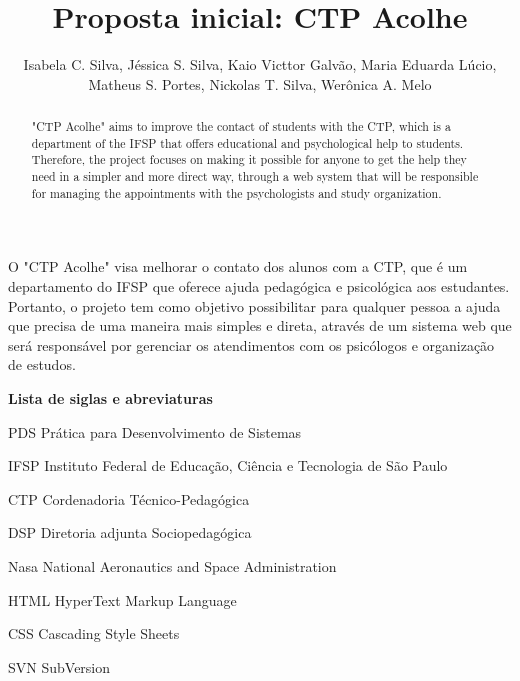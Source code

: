 \documentclass[12pt,a4paper]{article}
\title{Proposta inicial: CTP Acolhe}
\author{Isabela C. Silva, Jéssica S. Silva, Kaio Victtor Galvão, Maria Eduarda Lúcio,\\ Matheus S. Portes, Nickolas T. Silva, Werônica A. Melo }
\begin{document}
 

\maketitle

\begin{abstract}
  "CTP Acolhe" aims to improve the contact of students with the CTP, which is a department of the IFSP that offers educational and psychological help to students. Therefore, the project focuses on making it possible for anyone to get the help they need in a simpler and more direct way, through a web system that will be responsible for managing the appointments with the psychologists and study organization.

\end{abstract}
     
\begin{resumo} 
  O "CTP Acolhe" visa melhorar o contato dos alunos com a CTP, que é um departamento do IFSP que oferece ajuda pedagógica e psicológica aos estudantes. Portanto, o projeto tem como objetivo possibilitar para qualquer pessoa a ajuda que precisa de uma maneira mais simples e direta, através de um sistema web que será responsável por gerenciar os atendimentos com os psicólogos e organização de estudos.
\end{resumo}
\newpage


\listoffigures

\newpage
\begin{description}
        \item \textbf{Lista de siglas e abreviaturas}\\
        \item PDS Prática para Desenvolvimento de Sistemas
        \item IFSP Instituto Federal de Educação, Ciência e Tecnologia de São Paulo
        \item CTP Cordenadoria Técnico-Pedagógica
        \item DSP Diretoria adjunta Sociopedagógica
        \item Nasa National Aeronautics and Space Administration
        \item HTML HyperText Markup Language
        \item CSS Cascading Style Sheets
        \item SVN SubVersion
\end{description}

\newpage

\tableofcontents
\end{document}
